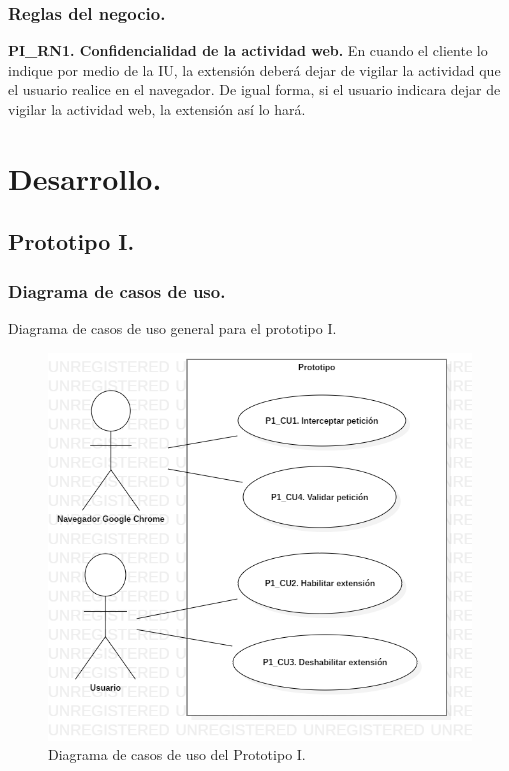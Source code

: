 \documentclass[12pt, a4paper, titlepage]{article}
\begin{document}
			\subsubsection{Reglas del negocio.}
				{\setlength{\parindent}{12pt}
					
				\label{PI_RN1}
				\textbf{PI\_RN1. Confidencialidad de la actividad web.} En cuando el cliente lo indique por medio de la IU, la extensión deberá dejar de vigilar la actividad que el usuario realice en el navegador. De igual forma, si el usuario indicara dejar de vigilar la actividad web, la extensión así lo hará.\\
					
				}\newpage
	\newpage
	\section{\textcolor{azulescom}{Desarrollo.}}
		\subsection{Prototipo I.}
			\subsubsection{Diagrama de casos de uso.}

				Diagrama de casos de uso general para el prototipo I.
				\begin{figure}[htb]
					\begin{center}
			    	\includegraphics[width=12cm]{./imagenes/UseDiagram_P1v2.png}
						\caption{Diagrama de casos de uso del Prototipo I.}
					\end{center}
				\end{figure}\newpage	
					
\end{document}
